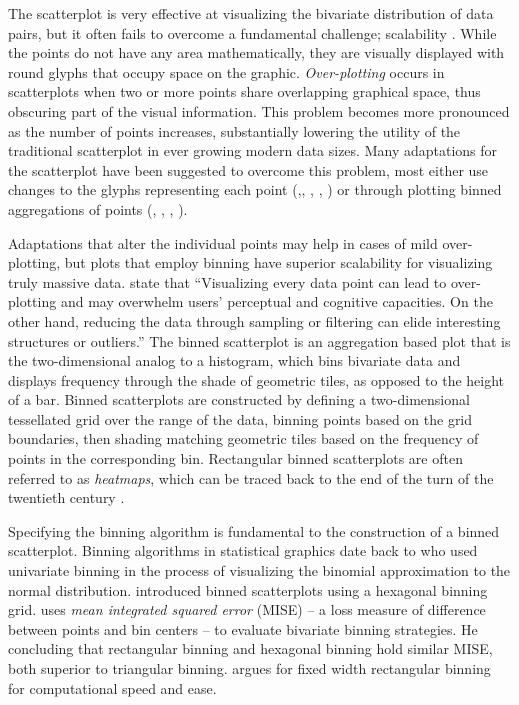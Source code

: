 \documentclass[11pt]{isuthesis}\usepackage[]{graphicx}\usepackage[]{color}
\begin{document}
The scatterplot is very effective at visualizing the bivariate distribution of data pairs, but it often fails to overcome a fundamental challenge; scalability \citep{Theus2006}. While the points do not have any area mathematically, they are visually displayed with round glyphs that occupy space on the graphic. \textit{Over-plotting} occurs in scatterplots when two or more points share overlapping graphical space, thus obscuring part of the visual information. This problem becomes more pronounced as the number of points increases, substantially lowering the utility of the traditional scatterplot in ever growing modern data sizes. Many adaptations for the scatterplot have been suggested to overcome this problem, most either use changes to the glyphs representing each point (\citealt{tukey},\citealt{few2008solutions}, \citealt{Keim2010GenScatter}, \citealt{Hao2010visual}, \citealt{Janetzko2013Ellipse}) or through plotting binned aggregations of points (\citealt{sunflowerplots}, \citealt{Carr1987}, \citealt{Wickham2013Bin}, \citealt{Liu2013imMens}). 

Adaptations that alter the individual points may help in cases of mild over-plotting, but plots that employ binning have superior scalability for visualizing truly massive data. \citet{Liu2013imMens} state that ``Visualizing every data point can lead to over-plotting and may overwhelm users' perceptual and cognitive capacities. On the other hand, reducing the data through sampling or filtering can elide interesting structures or outliers.'' The binned scatterplot is an aggregation based plot that is the two-dimensional analog to a histogram, which bins bivariate data and displays frequency through the shade of geometric tiles, as opposed to the height of a bar. Binned scatterplots are constructed by defining a two-dimensional tessellated grid over the range of the data, binning points based on the grid boundaries, then shading matching geometric tiles based on the frequency of points in the corresponding bin. Rectangular binned scatterplots are often referred to as \textit{heatmaps}, which can be traced back to the end of the turn of the twentieth century \citep{Wilkinson2000}.

Specifying the binning algorithm is fundamental to the construction of a binned scatterplot. Binning algorithms in statistical graphics date back to \citet{Pearson1895} who used univariate binning in the process of visualizing the binomial approximation to the normal distribution.  \citet{Carr1987} introduced binned scatterplots using a hexagonal binning grid. \citet{scott1992} uses \textit{mean integrated squared error} (MISE) -- a loss measure of difference between points and bin centers -- to evaluate bivariate binning strategies. He concluding that rectangular binning and hexagonal binning hold similar MISE, both superior to triangular binning. \citet{Wickham2013Bin} argues for fixed width rectangular binning for computational speed and ease. 
\end{document}
